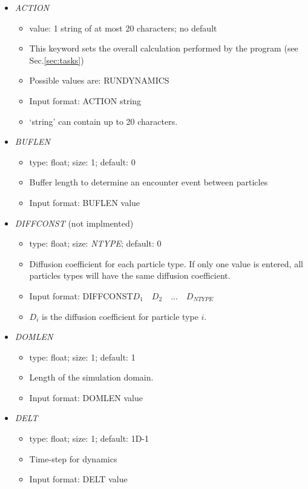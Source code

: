\documentclass[12pt]{article}
\begin{document}
\begin{itemize}
%
\item {\it ACTION}
  \begin{itemize}
    \item  value: 1 string of at most 20 characters; no default
    \item This keyword sets the overall calculation performed by the program (see Sec.\ref{sec:tasks})
    \item Possible values are: RUNDYNAMICS
    \item Input format: ACTION string
    \item `string' can contain up to 20 characters.
  \end{itemize}
%
\item {\it BUFLEN}
  \begin{itemize}
    \item  type: float; size: 1; default: 0
    \item Buffer length to determine an encounter event between particles
    \item Input format: BUFLEN value
  \end{itemize}
%
\item {\it DIFFCONST} (not implmented)
  \begin{itemize}
    \item  type: float; size: \textit{NTYPE}; default: 0
    \item Diffusion coefficient for each particle type. If only one value is entered, all particles types will have the same diffusion coefficient.
    \item Input format: DIFFCONST\quad$D_{1}\quad D_{2}\quad...\quad D_{NTYPE}$
    \item $D_{i}$ is the diffusion coefficient for particle type $i$.
  \end{itemize}
%
\item {\it DOMLEN}
	\begin{itemize}
	 	\item  type: float; size: 1; default: 1
	 	\item Length of the simulation domain.
	 	\item Input format: DOMLEN value
	\end{itemize}
%
\item {\it DELT}
  \begin{itemize}
    \item  type: float; size: 1; default: 1D-1
    \item Time-step for dynamics
    \item Input format: DELT value

\end{itemize}
\end{itemize}
\end{document}
